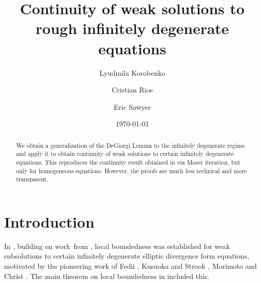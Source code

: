 \documentclass{amsart}
\theoremstyle{plain}
\numberwithin{equation}{section}
\begin{document}
	\title{Continuity of weak solutions to rough infinitely
		degenerate equations}
	\author{Lyudmila Korobenko}
	\address{McMaster University\\
		Hamilton, Ontario, Canada}
	\author{Cristian Rios}
	\address{University of Calgary\\
		Calgary, Alberta, Canada}
	\author{Eric Sawyer}
	\address{McMaster University\\
		Hamilton, Ontario, Canada}
	\date{\today }
	
	\begin{abstract}
		We obtain a generalization of the DeGiorgi Lemma to the infinitely
		degenerate regime and apply it to obtain continuity of weak
		solutions to certain infinitely degenerate equations. This reproduces the continuity result obtained in \cite{KoRiSaSh1} via Moser iteration, but only for homogeneous equations. However, the proofs are much less technical and more transparent.
	\end{abstract}
	
	\maketitle
	\tableofcontents

\section{Introduction}

In \cite{KoRiSaSh2}, building on work\ from \cite{KoRiSaSh1}, local
boundedness was established for weak subsolutions to certain infinitely
degenerate elliptic divergence form equations, motivated by the pioneering
work of Fedii \cite{Fe}, Kusuoka and Strook \cite{KuStr}, Morimoto \cite{Mor}
and Christ \cite{Chr}. The main theorem on local boundedness in \cite%
{KoRiSaSh2} included this.
\end{document}
